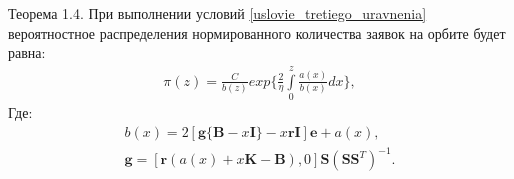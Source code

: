 Теорема 1.4. При выполнении условий \eqref{uslovie_tretiego_uravnenia}
вероятностное распределения нормированного
количества заявок на орбите будет равна:
\begin{align}
    \pi (z)=
        \frac{C}{b(z)}exp\bigg\{\frac{2}{\eta} 
        \int\limits_0^z \frac{a(x)}{b(x)}dx\bigg\},
\end{align}
Где:
\begin{gather*}
    b(x)=2[\boldsymbol{g}\{\boldsymbol{B}-x\boldsymbol{I}\}-x\boldsymbol{rI}]\boldsymbol{e}+ a(x), \\
    \boldsymbol{g}=[\boldsymbol{r}(a(x)+x\boldsymbol{K}-\boldsymbol{B}), 0]\boldsymbol{S}(\boldsymbol{S}\boldsymbol{S}^T)^{-1}.
\end{gather*}




